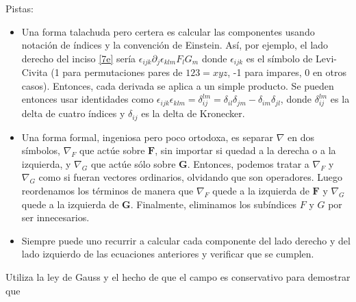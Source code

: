 \documentclass{exam}
\begin{document}
\begin{questions}
  Pistas:
  \begin{itemize}
  \item Una forma talachuda pero certera es calcular las componentes
    usando notación de índices y la convención de Einstein. Así, por
    ejemplo, el lado derecho del inciso \ref{7e} sería
    $\epsilon_{ijk}\partial_j\epsilon_{klm} F_l G_m$ donde
    $\epsilon_{ijk}$ es el símbolo de Levi-Civita (1 para
    permutaciones pares de $123=xyz$, -1 para impares, 0 en otros
    casos). Entonces, cada derivada se aplica a un simple producto. Se
    pueden entonces usar identidades como
    $\epsilon_{ijk}\epsilon_{klm} = \delta_{ij}^{lm} =
    \delta_{il}\delta_{jm} - \delta_{im}\delta_{jl}$, donde
    $\delta_{ij}^{lm}$ es la delta de cuatro índices y $\delta_{ij}$
    es la delta de Kronecker.
  \item Una forma formal, ingeniosa pero poco ortodoxa, es separar
    $\nabla$  en dos símbolos, $\nabla_F$ que actúe sobre $\bm F$, sin
    importar si quedad a la derecha o a la izquierda, y $\nabla_G$ que
    actúe sólo sobre $\bm G$. Entonces, podemos tratar a $\nabla_F$ y
    $\nabla_G$ como si fueran vectores ordinarios, olvidando que son
    operadores. Luego reordenamos los términos de manera que $\nabla_F$
    quede a la izquierda de $\bm F$ y $\nabla_G$ quede a la izquierda
    de $\bm G$. Finalmente, eliminamos los subíndices $F$ y $G$ por
    ser innecesarios.
  \item Siempre puede uno recurrir a calcular cada componente del lado
    derecho y del lado izquierdo de las ecuaciones anteriores y
    verificar que se cumplen.
  \end{itemize}
\question Utiliza la ley de Gauss y el hecho de que el campo es
conservativo para demostrar que
\end{questions}
\end{document}
